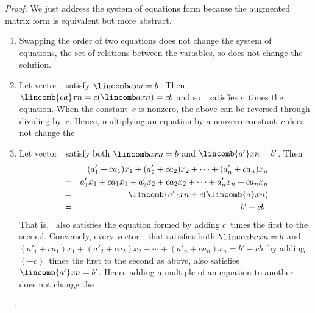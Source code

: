 \begin{proof} 
We just address the system of equations form because the augmented matrix form is equivalent but more abstract.
\begin{enumerate}
\item Swapping the order of two equations does not change the system of equations, the set of relations between the variables, so does not change the solution.
\item Let vector~\xv\ satisfy \(\lincomb axn=b\)\,.
Then \(\lincomb{ca}xn=c(\lincomb axn)=cb\) and so~\xv\ satisfies \(c\)~times the equation.
When the constant~\(c\) is nonzero, the above can be reversed through dividing by~\(c\).
Hence, multiplying an equation by a nonzero constant~\(c\) does not change the 

\item 
Let vector~\xv\ satisfy both \(\lincomb axn=b\) and \(\lincomb{a'}xn=b'\).
Then
\begin{eqnarray*}
&&(a'_1+ca_1)x_1+(a'_2+ca_2)x_2+\cdots+(a'_n+ca_n)x_n
\\&=&a'_1x_1+ca_1x_1+a'_2x_2+ca_2x_2+\cdots+a'_nx_n+ca_nx_n
\\&=&\lincomb{a'}xn +c(\lincomb{a}xn)
\\&=&b'+cb\,.
\end{eqnarray*}
That is, \xv~also satisfies the equation formed by adding \(c\)~times the first to the second.
Conversely, every vector~\xv\ that satisfies both \(\lincomb axn=b\) and \((a'_1+ca_1)x_1+(a'_2+ca_2)x_2+\cdots+(a'_n+ca_n)x_n=b'+cb\), by adding \((-c)\)~times the first to the second as above, also satisfies \(\lincomb{a'}xn=b'\).
Hence adding a multiple of an equation to another does not change the 

\end{enumerate}
\end{proof}



